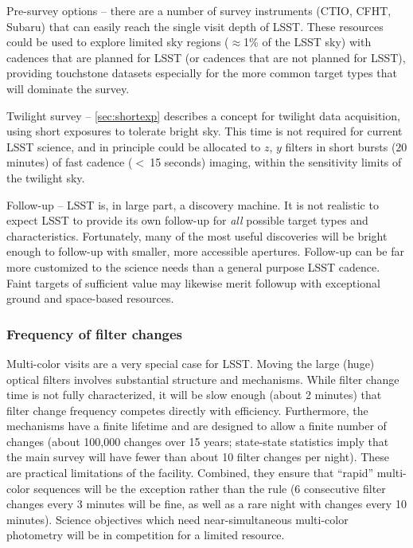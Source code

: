 \begin{description}

\item{Pre-survey options} -- there are a number of survey instruments
(CTIO, CFHT, Subaru) that can easily reach the single visit depth of
LSST. These resources could be used to explore limited sky regions
($\approx$1\% of the LSST sky) with cadences that are planned for LSST
(or cadences that are not planned for LSST), providing touchstone
datasets especially for the more common target types that will dominate
the survey.

\item{Twilight survey} -- \autoref{sec:shortexp} describes a concept for
twilight data acquisition, using short exposures to tolerate bright sky.
This time is not required for current LSST science, and in principle
could be allocated to $z$, $y$ filters in short bursts (20 minutes) of
fast cadence ($<~$15 seconds) imaging, within the sensitivity limits of
the twilight sky.

\item{Follow-up} -- LSST is, in large part, a discovery machine. It is
not realistic to expect LSST to provide its own follow-up for {\it all}
possible target types and characteristics. Fortunately, many of the most
useful discoveries will be bright enough to follow-up with smaller, more
accessible apertures.  Follow-up can be far more customized to the
science needs than a general purpose LSST cadence.  Faint targets of
sufficient value may likewise merit followup with exceptional  ground
and space-based resources.

\end{description}


\subsubsection{Frequency of filter changes}

Multi-color visits are a very special case for LSST.  Moving the large
(huge) optical filters involves substantial structure and mechanisms.
While filter change time is not fully characterized, it will be slow
enough (about 2 minutes) that filter change frequency competes directly
with efficiency. Furthermore, the mechanisms have a finite lifetime and
are designed to allow a finite number of changes (about 100,000 changes
over 15 years; state-state statistics imply that the main survey will
have fewer than about 10 filter changes per night). These are practical
limitations of the facility. Combined, they ensure that ``rapid''
multi-color sequences will be the exception rather than the rule (6
consecutive filter changes every 3 minutes will be fine, as well as a
rare night with changes every 10 minutes). Science objectives which need
near-simultaneous multi-color photometry will be in competition for a
limited resource.

